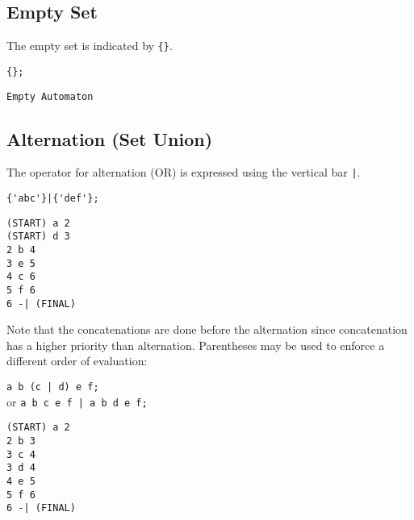 \subsection{Empty Set}
The empty set is indicated by \verb#{}#.
\begin{center}\begin{minipage}[t]{3in}\begin{minipage}[t]{3in}\begin{tabbing}
\qquad \= \verb#{};#
\end{tabbing}\end{minipage}\end{minipage}
\begin{minipage}[t]{1.6in}\begin{verbatim}
Empty Automaton
\end{verbatim}\end{minipage}\end{center}

\subsection{Alternation (Set Union)}
The operator for alternation (OR) is expressed using the vertical bar
\verb#|#.
\begin{center}\begin{minipage}[t]{3in}\begin{minipage}[t]{3in}\begin{tabbing}
\qquad \= \verb#{'abc'}|{'def'};#
\end{tabbing}\end{minipage}\end{minipage}
\begin{minipage}[t]{1.6in}\begin{verbatim}
(START) a 2
(START) d 3
2 b 4
3 e 5
4 c 6
5 f 6
6 -| (FINAL)
\end{verbatim}\end{minipage}\end{center}
Note that the concatenations are done before the alternation since
concatenation has a higher priority than alternation.
Parentheses may be used to enforce a different order of evaluation:
\begin{center}\begin{minipage}[t]{3in}\begin{minipage}[t]{3in}\begin{tabbing}
\qquad \= \verb#a b (c | d) e f;#\\
or \> \verb#a b c e f | a b d e f;#
\end{tabbing}\end{minipage}\end{minipage}
\begin{minipage}[t]{1.6in}\begin{verbatim}
(START) a 2
2 b 3
3 c 4
3 d 4
4 e 5
5 f 6
6 -| (FINAL)
\end{verbatim}\end{minipage}\end{center}

